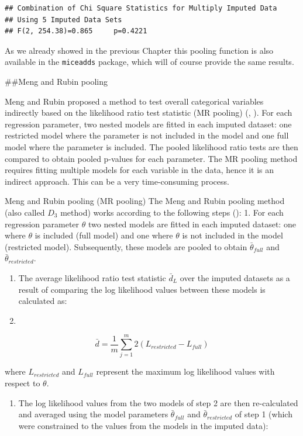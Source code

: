 \documentclass[
]{book}
\providecommand{\tightlist}{%
  \setlength{\itemsep}{0pt}\setlength{\parskip}{0pt}}
\begin{document}
\begin{verbatim}
## Combination of Chi Square Statistics for Multiply Imputed Data
## Using 5 Imputed Data Sets
## F(2, 254.38)=0.865     p=0.4221
\end{verbatim}

As we already showed in the previous Chapter this pooling function is also available in the \texttt{miceadds} package, which will of course provide the same results.

\#\#Meng and Rubin pooling

Meng and Rubin proposed a method to test overall categorical variables indirectly based on the likelihood ratio test statistic (MR pooling) (\citet{Meng1992}, \citet{Mistler2013}). For each regression parameter, two nested models are fitted in each imputed dataset: one restricted model where the parameter is not included in the model and one full model where the parameter is included. The pooled likelihood ratio tests are then compared to obtain pooled p-values for each parameter. The MR pooling method requires fitting multiple models for each variable in the data, hence it is an indirect approach. This can be a very time-consuming process.

Meng and Rubin pooling (MR pooling)
The Meng and Rubin pooling method (also called \(D_3\) method) works according to the following steps (\citet{Meng1992}):
1. For each regression parameter \(\theta\) two nested models are fitted in each imputed dataset: one where \(\theta\) is included (full model) and one where \(\theta\) is not included in the model (restricted model). Subsequently, these models are pooled to obtain \(\bar\theta_{full}\) and \(\bar\theta_{restricted}\).

\begin{enumerate}
\def\labelenumi{\arabic{enumi}.}
\setcounter{enumi}{1}
\item
  The average likelihood ratio test statistic \(\bar d_L\) over the imputed datasets as a result of comparing the log likelihood values between these models is calculated as:
\item
\end{enumerate}

\[\bar d = \frac{1}{m} \sum_{j=1}^m 2(L_{restricted} - L_{full})\]

where \(L_{restricted}\) and \(L_{full}\) represent the maximum log likelihood values with respect to \(\theta\).

\begin{enumerate}
\def\labelenumi{\arabic{enumi}.}
\setcounter{enumi}{3}
\tightlist
\item
  The log likelihood values from the two models of step 2 are then re-calculated and averaged using the model parameters \(\bar\theta_{full}\) and \(\bar\theta_{restricted}\) of step 1 (which were constrained to the values from the models in the imputed data):
\end{enumerate}
\end{document}
